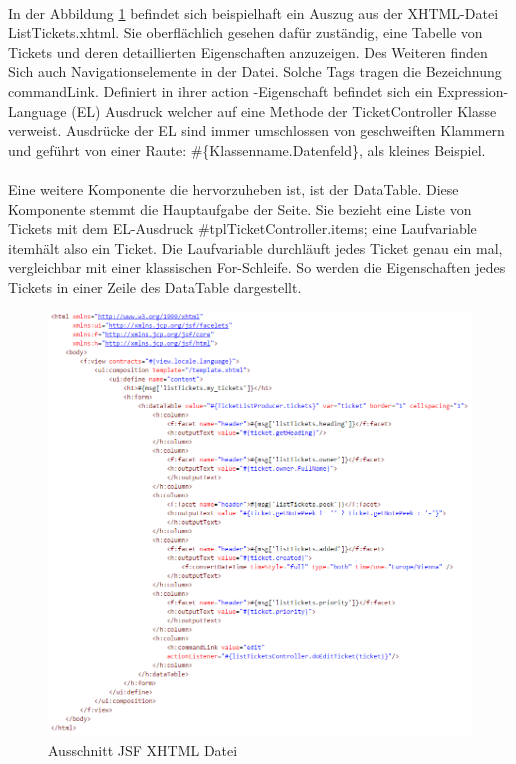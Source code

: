 \paragraph{}
In der Abbildung \ref{Abb_Jsf_XHTML_Code} befindet sich beispielhaft ein Auszug aus der XHTML-Datei ListTickets.xhtml. Sie oberflächlich gesehen dafür zuständig, eine Tabelle von Tickets und deren detaillierten Eigenschaften anzuzeigen. Des Weiteren finden Sich auch Navigationselemente in der Datei. Solche Tags tragen die Bezeichnung \glqq commandLink\grqq. Definiert in ihrer \glqq action \grqq -Eigenschaft befindet sich ein Expression-Language (EL) Ausdruck welcher auf eine Methode der TicketController Klasse verweist. Ausdrücke der EL sind immer umschlossen von geschweiften Klammern und geführt von einer Raute: \#\{Klassenname.Datenfeld\}, als kleines Beispiel.
\paragraph{}
Eine weitere Komponente die hervorzuheben ist, ist der DataTable. Diese Komponente stemmt die Hauptaufgabe der Seite. Sie bezieht eine Liste von Tickets mit dem EL-Ausdruck \glqq \#{tplTicketController.items}\grqq; eine Laufvariable \glqq item\grqq hält also ein Ticket. Die Laufvariable durchläuft jedes Ticket genau ein mal, vergleichbar mit einer klassischen For-Schleife. So werden die Eigenschaften jedes Tickets in einer Zeile des DataTable dargestellt.

\begin{figure}[h]
	\centering
	\includegraphics[scale=0.75]{figures/serverFacesCode.png}
	\caption{Ausschnitt JSF XHTML Datei}
	\label{Abb_Jsf_XHTML_Code}
\end{figure}

